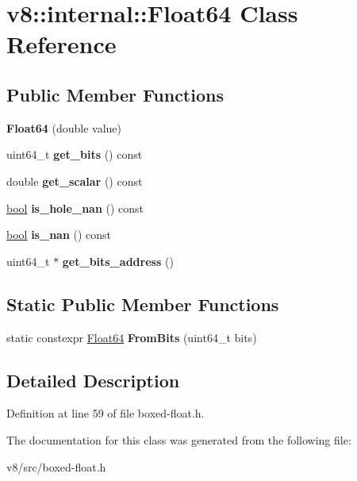 \hypertarget{classv8_1_1internal_1_1Float64}{}\section{v8\+:\+:internal\+:\+:Float64 Class Reference}
\label{classv8_1_1internal_1_1Float64}
\subsection*{Public Member Functions}
\begin{DoxyCompactItemize}
\item 
\mbox{\label{classv8_1_1internal_1_1Float64_a8f9051747943a3ab5ee52ebe2b80d4d7}} 
{\bfseries Float64} (double value)
\item 
\mbox{\label{classv8_1_1internal_1_1Float64_af013737e6226d6d116e38ece413557ab}} 
uint64\+\_\+t {\bfseries get\+\_\+bits} () const
\item 
\mbox{\label{classv8_1_1internal_1_1Float64_af47decdda2dcabab362ace3896c62f64}} 
double {\bfseries get\+\_\+scalar} () const
\item 
\mbox{\label{classv8_1_1internal_1_1Float64_a24be36e444269e810b89eb21067ef6b2}} 
\mbox{\hyperlink{classbool}{bool}} {\bfseries is\+\_\+hole\+\_\+nan} () const
\item 
\mbox{\label{classv8_1_1internal_1_1Float64_a5b2e962fa713db2f772c69a2e05c1046}} 
\mbox{\hyperlink{classbool}{bool}} {\bfseries is\+\_\+nan} () const
\item 
\mbox{\label{classv8_1_1internal_1_1Float64_ae4e54e18205815b789de7b85b5cda5ed}} 
uint64\+\_\+t $\ast$ {\bfseries get\+\_\+bits\+\_\+address} ()
\end{DoxyCompactItemize}
\subsection*{Static Public Member Functions}
\begin{DoxyCompactItemize}
\item 
\mbox{\label{classv8_1_1internal_1_1Float64_af3ad30b405d5967ed9a85d1e6fd3d747}} 
static constexpr \mbox{\hyperlink{classv8_1_1internal_1_1Float64}{Float64}} {\bfseries From\+Bits} (uint64\+\_\+t bits)
\end{DoxyCompactItemize}


\subsection{Detailed Description}


Definition at line 59 of file boxed-\/float.\+h.



The documentation for this class was generated from the following file\+:\begin{DoxyCompactItemize}
\item 
v8/src/boxed-\/float.\+h\end{DoxyCompactItemize}
